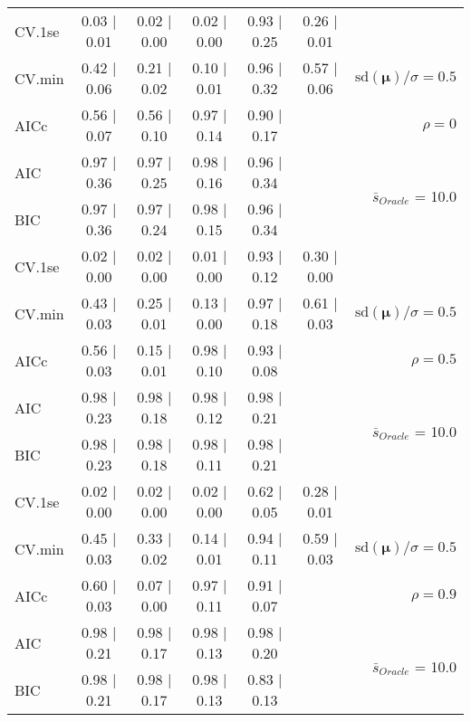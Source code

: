 \begin{table}
\begin{center}
\begin{tabular}{l*{5}{c}|r}
 \hline 
CV.1se & 0.03 $\mid$ 0.01 & 0.02 $\mid$ 0.00 & 0.02 $\mid$ 0.00 & 0.93 $\mid$ 0.25 & 0.26 $\mid$ 0.01 & \\
CV.min & 0.42 $\mid$ 0.06 & 0.21 $\mid$ 0.02 & 0.10 $\mid$ 0.01 & 0.96 $\mid$ 0.32 & 0.57 $\mid$ 0.06 &  $\mathrm{sd}(\mathbf{\mu})/\sigma=0.5$ \\
AICc & 0.56 $\mid$ 0.07 & 0.56 $\mid$ 0.10 & 0.97 $\mid$ 0.14 & 0.90 $\mid$ 0.17 & & $\rho=0$ \\
AIC & 0.97 $\mid$ 0.36 & 0.97 $\mid$ 0.25 & 0.98 $\mid$ 0.16 & 0.96 $\mid$ 0.34 & &  \multirow{2}{*}{$\bar{s}_{Oracle}$ = 10.0} \\
BIC & 0.97 $\mid$ 0.36 & 0.97 $\mid$ 0.24 & 0.98 $\mid$ 0.15 & 0.96 $\mid$ 0.34 & &  \\
 \hline 
CV.1se & 0.02 $\mid$ 0.00 & 0.02 $\mid$ 0.00 & 0.01 $\mid$ 0.00 & 0.93 $\mid$ 0.12 & 0.30 $\mid$ 0.00 & \\
CV.min & 0.43 $\mid$ 0.03 & 0.25 $\mid$ 0.01 & 0.13 $\mid$ 0.00 & 0.97 $\mid$ 0.18 & 0.61 $\mid$ 0.03 &  $\mathrm{sd}(\mathbf{\mu})/\sigma=0.5$ \\
AICc & 0.56 $\mid$ 0.03 & 0.15 $\mid$ 0.01 & 0.98 $\mid$ 0.10 & 0.93 $\mid$ 0.08 & & $\rho=0.5$ \\
AIC & 0.98 $\mid$ 0.23 & 0.98 $\mid$ 0.18 & 0.98 $\mid$ 0.12 & 0.98 $\mid$ 0.21 & &  \multirow{2}{*}{$\bar{s}_{Oracle}$ = 10.0} \\
BIC & 0.98 $\mid$ 0.23 & 0.98 $\mid$ 0.18 & 0.98 $\mid$ 0.11 & 0.98 $\mid$ 0.21 & &  \\
 \hline 
CV.1se & 0.02 $\mid$ 0.00 & 0.02 $\mid$ 0.00 & 0.02 $\mid$ 0.00 & 0.62 $\mid$ 0.05 & 0.28 $\mid$ 0.01 & \\
CV.min & 0.45 $\mid$ 0.03 & 0.33 $\mid$ 0.02 & 0.14 $\mid$ 0.01 & 0.94 $\mid$ 0.11 & 0.59 $\mid$ 0.03 &  $\mathrm{sd}(\mathbf{\mu})/\sigma=0.5$ \\
AICc & 0.60 $\mid$ 0.03 & 0.07 $\mid$ 0.00 & 0.97 $\mid$ 0.11 & 0.91 $\mid$ 0.07 & & $\rho=0.9$ \\
AIC & 0.98 $\mid$ 0.21 & 0.98 $\mid$ 0.17 & 0.98 $\mid$ 0.13 & 0.98 $\mid$ 0.20 & &  \multirow{2}{*}{$\bar{s}_{Oracle}$ = 10.0} \\
BIC & 0.98 $\mid$ 0.21 & 0.98 $\mid$ 0.17 & 0.98 $\mid$ 0.13 & 0.83 $\mid$ 0.13 & &  \\
 \hline 
\end{tabular}
\end{center}
\vspace{-1cm}
\end{table}




